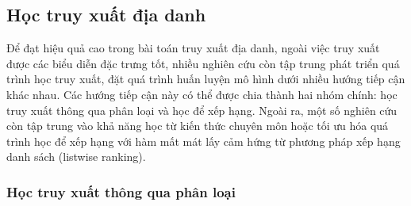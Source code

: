 \subsection{Học truy xuất địa danh}

Để đạt hiệu quả cao trong bài toán truy xuất địa danh, ngoài việc truy xuất được các biểu diễn đặc trưng tốt, nhiều nghiên cứu còn tập trung phát triển quá trình học truy xuất, đặt quá trình huấn luyện mô hình dưới nhiều hướng tiếp cận khác nhau. Các hướng tiếp cận này có thể được chia thành hai nhóm chính: học truy xuất thông qua phân loại và học để xếp hạng. Ngoài ra, một số nghiên cứu còn tập trung vào khả năng học từ kiến thức chuyên môn hoặc tối ưu hóa quá trình học để xếp hạng với hàm mất mát lấy cảm hứng từ phương pháp xếp hạng danh sách (listwise ranking).

\subsubsection{Học truy xuất thông qua phân loại}

